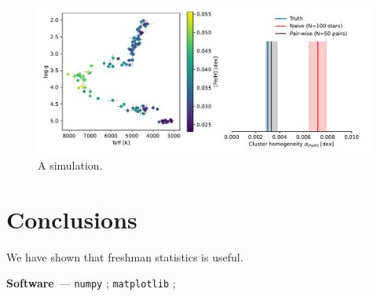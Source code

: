\documentclass[modern]{aastex631}
\renewcommand{\paragraph}[1]{\medskip\par\noindent\textbf{#1}~---}
\begin{document}
\begin{figure}
    \includegraphics*[width=\textwidth]{simulation.pdf}
    \caption{A simulation.\label{fig:simulation}}
\end{figure}


\section{Conclusions} \label{sec:conclusions}
We have shown that freshman statistics is useful.

\paragraph{Software}
\texttt{numpy} \citep{numpy}; 
\texttt{matplotlib} \citep{matplotlib}; 



%
\end{document}
